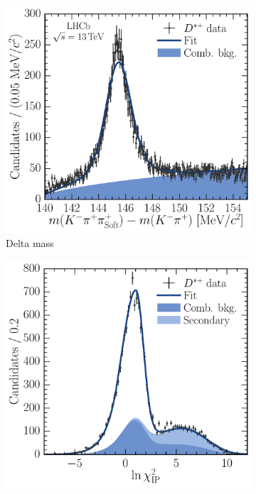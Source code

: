 \begin{figure}
\begin{subfigure}[b]{0.5\textwidth}
    \caption{\lnipchisq}
    \label{fig:prod:fitting:DstToD0pi_D0ToKpi:ipchisq_high_sig}
  \end{subfigure}
  \begin{subfigure}[b]{0.5\textwidth}
    \centering
    \includegraphics[width=\textwidth]{figures/production/fitting/DstToD0pi_D0ToKpi_delta_mass_fit_pT_2_y_3}
    \caption{Delta mass}
    \label{fig:prod:fitting:DstToD0pi_D0ToKpi:delta_mass_high_bkg}
  \end{subfigure}
  \begin{subfigure}[b]{0.5\textwidth}
    \centering
    \includegraphics[width=\textwidth]{figures/production/fitting/DstToD0pi_D0ToKpi_ipchisq_fit_pT_2_y_3}

\end{subfigure}
\end{figure}
